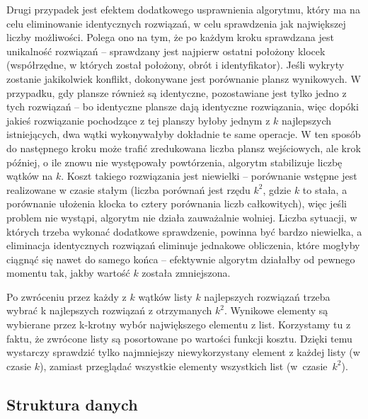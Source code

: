 \documentclass{article}
\begin{document}
Drugi przypadek jest efektem dodatkowego usprawnienia algorytmu, który ma na celu eliminowanie identycznych rozwiązań, w celu sprawdzenia jak największej liczby możliwości. Polega ono na tym, że po każdym kroku sprawdzana jest unikalność rozwiązań -- sprawdzany jest najpierw ostatni położony klocek (współrzędne, w których został położony, obrót i identyfikator). Jeśli wykryty zostanie jakikolwiek konflikt, dokonywane jest porównanie plansz wynikowych. W przypadku, gdy plansze również są identyczne, pozostawiane jest tylko jedno z tych rozwiązań -- bo identyczne plansze dają identyczne rozwiązania, więc dopóki jakieś rozwiązanie pochodzące z tej planszy byłoby jednym z $k$ najlepszych istniejących, dwa wątki wykonywałyby dokładnie te same operacje. W ten sposób do następnego kroku może trafić zredukowana liczba plansz wejściowych, ale krok później, o ile znowu nie występowały powtórzenia, algorytm stabilizuje liczbę wątków na $k$. Koszt takiego rozwiązania jest niewielki -- porównanie wstępne jest realizowane w czasie stałym (liczba porównań jest rzędu $k^2$, gdzie $k$ to stała, a porównanie ułożenia klocka to cztery porównania liczb całkowitych), więc jeśli problem nie wystąpi, algorytm nie działa zauważalnie wolniej. Liczba sytuacji, w których trzeba wykonać dodatkowe sprawdzenie, powinna być bardzo niewielka, a eliminacja identycznych rozwiązań eliminuje jednakowe obliczenia, które mogłyby ciągnąć się nawet do samego końca -- efektywnie algorytm działałby od pewnego momentu tak, jakby wartość $k$ została zmniejszona.

Po zwróceniu przez każdy z $k$ wątków listy $k$ najlepszych rozwiązań trzeba wybrać k najlepszych rozwiązań z otrzymanych $k^2$.  
Wynikowe elementy są wybierane przez k-krotny wybór największego elementu z list.
Korzystamy tu z faktu, że zwrócone listy są posortowane po wartości funkcji kosztu.
Dzięki temu wystarczy sprawdzić tylko najmniejszy niewykorzystany element z każdej listy (w czasie $k$), zamiast przeglądać wszystkie elementy wszystkich list (w~czasie~$k^2$).
\subsection{Struktura danych}
\end{document}
